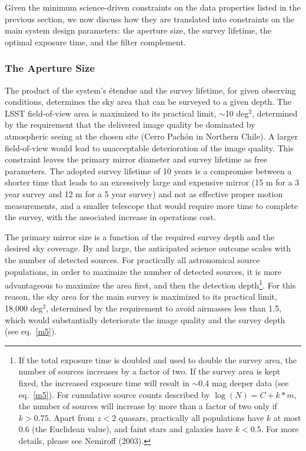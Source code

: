Given the minimum science-driven constraints on the data properties listed
in the previous section, we now discuss how they are translated into
constraints on the main system design parameters: the aperture size,
the survey lifetime, the optimal exposure time, and the filter complement.


\subsubsection{ The Aperture Size }
\label{Sec:apSize}
The product of the system's \'etendue and the survey lifetime, for given
observing conditions, determines
the sky area that can be surveyed to a given depth.
The
LSST field-of-view area is maximized to its practical limit, $\sim$10 deg$^2$,
determined by the requirement that the delivered image quality be dominated
by atmospheric seeing at the chosen site (Cerro Pach\'{o}n in Northern Chile).
A larger field-of-view would lead to unacceptable deterioration of the
image quality. This constraint leaves the primary mirror diameter and survey lifetime
as free parameters. The adopted survey lifetime of 10 years is a compromise
between a shorter time that leads to an excessively large and expensive mirror (15 m for a
3 year survey and 12 m for a 5 year survey) and not as effective proper motion
measurements, and a smaller telescope that would require more time to complete the
survey, with the associated increase in operations cost.

The primary mirror size is a function of the required survey depth and the
desired sky coverage. By and large, the anticipated science outcome scales
with the number of detected sources. For practically all astronomical source
populations, in order to maximize the number of detected sources, it is more
advantageous to maximize the area first, and then
the detection depth\footnote{
If the total exposure time is doubled and used to double the survey area,
the number of sources increases by a factor of two. If the survey
area is kept fixed, the increased exposure time will result in
$\sim$0.4 mag deeper data (see eq.~\ref{m5}). For cumulative source
counts described by $\log(N) = C + k*m$, the number of sources
will increase by more than a factor of two only if $k>0.75$.
Apart from $z<2$ quasars, practically all populations
have $k$ at most 0.6 (the Euclidean value), and faint stars
and galaxies have $k<0.5$. For more details, please see Nemiroff
(2003).}. For this reason, the sky area for the main survey is
maximized to its practical limit, 18,000 deg$^2$, determined by the
requirement to avoid airmasses less than 1.5,
which would substantially
deteriorate the image quality and the survey depth (see eq.~\ref{m5}).

